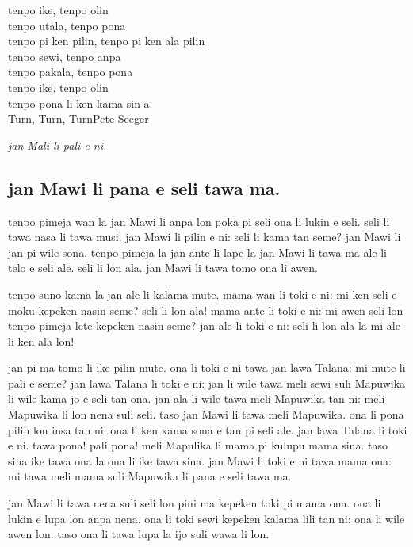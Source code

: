 tenpo ike, tenpo olin \\
tenpo utala, tenpo pona \\
tenpo pi ken pilin, tenpo pi ken ala pilin \\

tenpo sewi, tenpo anpa \\
tenpo pakala, tenpo pona \\
tenpo ike, tenpo olin \\
tenpo pona li ken kama sin a. \\

\glqq Turn, Turn, Turn\grqq   Pete Seeger 

\textit{jan Mali li pali e ni. \cite{www:astrodonunt:01}}
%
\newpage
\subsection{jan Mawi li pana e seli tawa ma.}

tenpo pimeja wan la jan Mawi li anpa lon poka pi seli ona li lukin e seli. 
seli li tawa nasa li tawa musi. 
jan Mawi li pilin e ni: \glqq seli li kama tan seme?\grqq   
jan Mawi li jan pi wile sona. 
tenpo pimeja la jan ante li lape la jan Mawi li tawa ma ale li telo e seli ale. 
seli li lon ala. 
jan Mawi li tawa tomo ona li awen.

tenpo suno kama la jan ale li kalama mute.
mama wan li toki e ni: \glqq mi ken seli e moku kepeken nasin seme? 
seli li lon ala!\grqq   
mama ante li toki e ni: \glqq mi awen seli lon tenpo pimeja lete kepeken nasin seme?\grqq   
jan ale li toki e ni: \glqq seli li lon ala la mi ale li ken ala lon!\grqq   

jan pi ma tomo li ike pilin mute. 
ona li toki e ni tawa jan lawa Talana: \glqq mi mute li pali e seme?\grqq   
jan lawa Talana li toki e ni: \glqq jan li wile tawa meli sewi suli Mapuwika li wile kama jo e seli tan ona.\grqq   
jan ala li wile tawa meli Mapuwika tan ni: meli Mapuwika li lon nena suli seli. 
taso jan Mawi li tawa meli Mapuwika. 
ona li pona pilin lon insa tan ni: ona li ken kama sona e tan pi seli ale.
jan lawa Talana li toki e ni. 
\grqq   tawa pona!
pali pona!
meli Mapulika li mama pi kulupu mama sina. 
taso sina ike tawa ona la ona li ike tawa sina.\grqq   
jan Mawi li toki e ni tawa mama ona: \glqq mi tawa meli mama suli Mapuwika li pana e seli tawa ma.\grqq   

jan Mawi li tawa nena suli seli lon pini ma kepeken toki pi mama ona. 
ona li lukin e lupa lon anpa nena. 
ona li toki sewi kepeken kalama lili tan ni: ona li wile awen lon. 
taso ona li tawa lupa la ijo suli wawa li lon.

